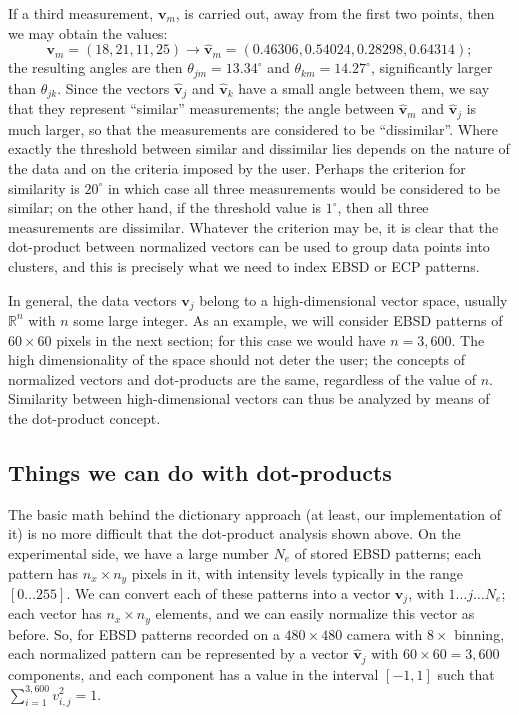 \documentclass[DIV=calc, paper=letter, fontsize=11pt]{scrartcl}	 %
\begin{document}
If a third measurement, $\mathbf{v}_m$,  is carried out, away from the first two points, then we may obtain the values:
\[
	\mathbf{v}_m = (18, 21, 11, 25) \rightarrow \hat{\mathbf{v}}_m = (0.46306,      0.54024,      0.28298,     0.64314);
\]
the resulting angles are then $\theta_{jm}=13.34^{\circ}$ and $\theta_{km}=14.27^{\circ}$, significantly larger than $\theta_{jk}$. Since the 
vectors $\hat{\mathbf{v}}_j$ and $\hat{\mathbf{v}}_k$ have a small angle between them, we say that they represent ``similar'' measurements;
the angle between $\hat{\mathbf{v}}_m$ and $\hat{\mathbf{v}}_j$ is much larger, so that the measurements are considered to be ``dissimilar''.
Where exactly the threshold between similar and dissimilar lies depends on the nature of the data and on the criteria imposed by the 
user.  Perhaps the criterion for similarity is $20^{\circ}$ in which case all three measurements would be considered to be similar; on the other
hand, if the threshold value is $1^{\circ}$, then all three measurements are dissimilar.  Whatever the criterion may be, it is clear that 
the dot-product between normalized vectors can be used to group data points into clusters, and this is precisely what we need 
to index EBSD or ECP patterns.

In general, the data vectors $\mathbf{v}_j$ belong to a high-dimensional vector space, usually $\mathbb{R}^n$ with $n$ some large integer. As
an example, we will consider EBSD patterns of $60\times 60$ pixels in the next section; for this case we would have $n=3,600$.  The high
dimensionality of the space should not deter the user; the concepts of normalized vectors and dot-products are the same, regardless of the 
value of $n$. Similarity between high-dimensional vectors can thus be analyzed by means of the dot-product concept.

\subsection{Things we can do with dot-products}
The basic math behind the dictionary approach (at least, our implementation of it) is no more difficult that the dot-product analysis
shown above.  On the experimental side, we have a large number $N_e$ of stored EBSD patterns; each pattern has $n_x\times n_y$ pixels
in it, with intensity levels typically in the range $[0\ldots 255]$.  We can convert each of these patterns into a vector $\mathbf{v}_j$,
with $1\ldots j\ldots N_e$; each vector has $n_x\times n_y$ elements, and we can easily normalize this vector as before.  So, for 
EBSD patterns recorded on a $480\times 480$ camera with $8\times$ binning, each normalized pattern can be represented by a vector $\hat{\mathbf{v}}_j$ 
with $60\times60=3,600$ components, and each component has a value in the interval $[-1,1]$ such that $\sum_{i=1}^{3,600} v_{i,j}^2 = 1$.
\end{document}
